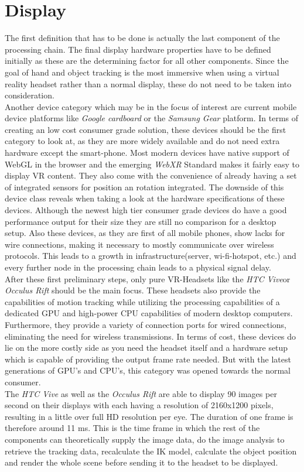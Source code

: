  \section{Display}
 The first definition that has to be done is actually the last component of the processing chain. The final display hardware properties have to be defined initially as these are the determining factor for all other components. Since the goal of hand and object tracking is the most immersive when using a virtual reality headset rather than a normal display, these do not need to be taken into consideration.\\
Another device category which may be in the focus of interest are current mobile device platforms like \textit{Google cardboard} or the \textit{Samsung Gear} platform. In terms of creating an low cost consumer grade solution, these devices should be the first category to look at, as they are more widely available and do not need extra hardware except the smart-phone. Most modern devices have native support of WebGL in the browser and the emerging \textit{WebXR} Standard makes it fairly easy to display VR content. They also come with the convenience of already having a set of integrated sensors for position an rotation integrated. The downside of this device class reveals when taking a look at the hardware specifications of these devices. Although the newest high tier consumer grade devices do have a good performance output for their size they are still no comparison for a desktop setup. Also these devices, as they are first of all mobile phones, show lacks for wire connections, making it necessary to mostly communicate over wireless protocols. This leads to a growth in infrastructure(server, wi-fi-hotspot, etc.) and every further node in the processing chain leads to a physical signal delay.\\
After these first preliminary steps, only pure VR-Headsets like the \textit{HTC Vive}\cite{HTC.2018}or \textit{Occulus Rift} \cite{OculusVR.2018}should be the main focus. These headsets also provide the capabilities of motion tracking while utilizing the processing capabilities of a dedicated GPU and high-power CPU capabilities of modern desktop computers. Furthermore, they provide a variety of connection ports for wired connections, eliminating the need for wireless transmissions. In terms of cost, these devices do lie on the more costly side as you need the headset itself and a hardware setup which is capable of providing the output frame rate needed. But with the latest generations of GPU's and CPU's, this category was opened towards the normal consumer.\\
The \textit{HTC Vive} as well as the \textit{Occulus Rift} are able to display 90 images per second on their displays with each having a resolution of 2160x1200 pixels, resulting in a little over full HD resolution per eye. The duration of one frame is therefore around 11 ms. This is the time frame in which the rest of the components can theoretically supply the image data, do the image analysis to retrieve the tracking data, recalculate the IK model, calculate the object position and render the whole scene before sending it to the headset to be displayed.

